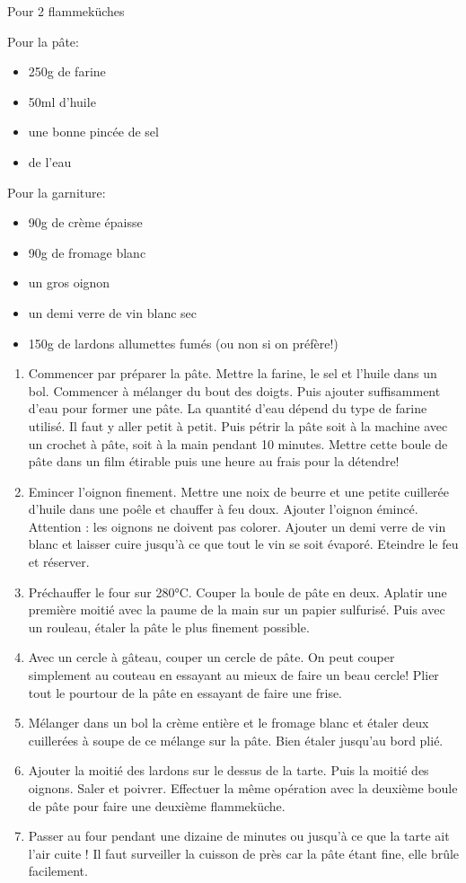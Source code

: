 \bigskip
{}
{Pour 2 flammeküches}{
 Pour la pâte:
\begin{itemize}
  \item 250g de farine
  \item 50ml d'huile
  \item une bonne pincée de sel
  \item de l'eau
\end{itemize}
Pour la garniture:
\begin{itemize}
  \item 90g de crème épaisse
  \item 90g de fromage blanc
  \item un gros oignon
  \item un demi verre de vin blanc sec
  \item 150g de lardons allumettes fumés (ou non si on préfère!)
\end{itemize}}
{\begin{enumerate}
	\item Commencer par préparer la pâte. Mettre la farine, le sel et l'huile dans un bol. Commencer à mélanger du bout des doigts. Puis ajouter suffisamment d'eau pour former une pâte. La quantité d'eau dépend du type de farine utilisé. Il faut y aller petit à petit. Puis pétrir la pâte soit à la machine avec un crochet à pâte, soit à la main pendant 10 minutes. Mettre cette boule de pâte dans un film étirable puis une heure au frais pour la détendre!
	\item Emincer l'oignon finement. Mettre une noix de beurre et une petite cuillerée d'huile dans une poêle et chauffer à feu doux. Ajouter l'oignon émincé. Attention : les oignons ne doivent pas colorer. Ajouter un demi verre de vin blanc et laisser cuire jusqu'à ce que tout le vin se soit évaporé. Eteindre le feu et réserver.
	\item Préchauffer le four sur 280°C. Couper la boule de pâte en deux. Aplatir une première moitié avec la paume de la main sur un papier sulfurisé. Puis avec un rouleau, étaler la pâte le plus finement possible.
	\item Avec un cercle à gâteau, couper un cercle de pâte. On peut couper simplement au couteau en essayant au mieux de faire un beau cercle! Plier tout le pourtour de la pâte en essayant de faire une frise. 
	\item Mélanger dans un bol la crème entière et le fromage blanc et étaler deux cuillerées à soupe de ce mélange sur la pâte. Bien étaler jusqu'au bord plié.
	\item Ajouter la moitié des lardons sur le dessus de la tarte. Puis la moitié des oignons. Saler et poivrer. Effectuer la même opération avec la deuxième boule de pâte pour faire une deuxième flammeküche.
	\item Passer au four pendant une dizaine de minutes ou jusqu'à ce que la tarte ait l'air cuite ! Il faut surveiller la cuisson de près car la pâte étant fine, elle brûle facilement.
\end{enumerate}
}

